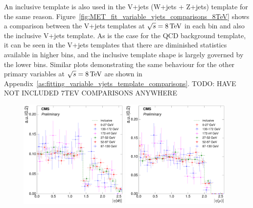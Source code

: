An inclusive template is also used in the V+jets (W+jets + Z+jets) template for the same reason.
Figure~\ref{fig:MET_fit_variable_vjets_comparisons_8TeV} shows a comparison between the V+jets templates at
$\sqrt{s}=8\,\text{Te\hspace{-.08em}V}$ in each \met bin and also the inclusive \met V+jets template.
As is the case for the QCD background template, it can be seen in the V+jets templates that there are
diminished statistics available in higher bins, and the inclusive template shape is largely governed by the
lower bins. Similar plots demonstrating the same behaviour for the other primary variables at $\sqrt{s}=8\,\text{Te\hspace{-.08em}V}$
are shown in Appendix~\ref{as:fitting_variable_vjets_template_comparisons}. TODO: HAVE NOT INCLUDED 7TEV
COMPARISONS ANYWHERE %

\begin{figure}[hbtp]
    \centering
     \includegraphics[width=0.48\textwidth]{Chapters/04_Analysis/04b_XSections/images/8TeV/fit_variables/electron/MET/electron_absolute_eta/vjets/MET_electron_absolute_eta_2orMoreBtags_VJets_template_comparison.pdf}\hfill
     \includegraphics[width=0.48\textwidth]{Chapters/04_Analysis/04b_XSections/images/8TeV/fit_variables/muon/MET/muon_absolute_eta/vjets/MET_muon_absolute_eta_2orMoreBtags_VJets_template_comparison.pdf}\\

\end{figure}
